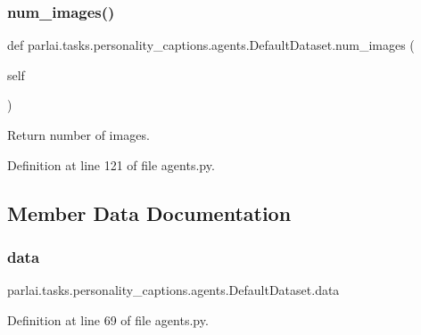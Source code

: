 \subsubsection{\texorpdfstring{num\+\_\+images()}{num\_images()}}
{\footnotesize\ttfamily def parlai.\+tasks.\+personality\+\_\+captions.\+agents.\+Default\+Dataset.\+num\+\_\+images (\begin{DoxyParamCaption}\item[{}]{self }\end{DoxyParamCaption})}

\begin{DoxyVerb}Return number of images.\end{DoxyVerb}
 

Definition at line 121 of file agents.\+py.



\subsection{Member Data Documentation}
\mbox{\label{classparlai_1_1tasks_1_1personality__captions_1_1agents_1_1DefaultDataset_a52ccf1dae943d045a66a7bcc66804638}} 
\subsubsection{\texorpdfstring{data}{data}}
{\footnotesize\ttfamily parlai.\+tasks.\+personality\+\_\+captions.\+agents.\+Default\+Dataset.\+data}



Definition at line 69 of file agents.\+py.



